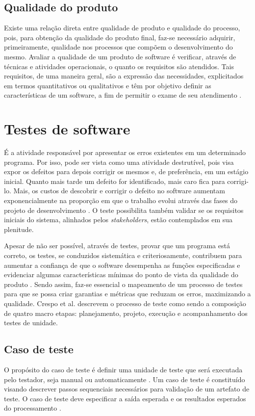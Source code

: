 \documentclass[tg]{mdtufsm}
\begin{document}
\subsection{Qualidade do produto}
Existe uma relação direta entre qualidade de produto e qualidade do processo, pois, para obtenção da qualidade do produto final,
faz-se necessário adquirir, primeiramente, qualidade nos processos que compõem o desenvolvimento do mesmo.
Avaliar a qualidade de um produto de software é verificar, através de técnicas e atividades operacionais, o quanto os requisitos são atendidos. Tais requisitos,
de uma maneira geral, são a expressão das necessidades, explicitados em termos quantitativos ou qualitativos e têm por objetivo definir as características de
um software, a fim de permitir o exame de seu atendimento \cite{koscianski2007qualidade}.

\section{Testes de software}
É a atividade responsável por apresentar os erros existentes em um determinado programa. Por isso, pode ser vista como uma atividade destrutível, pois visa expor os defeitos para depois corrigir os mesmos e, de preferência, em um estágio inicial. Quanto mais tarde um defeito for identificado, mais caro fica para corrigi-lo. Mais, os custos de descobrir e corrigir o defeito no software aumentam exponencialmente na proporção em que o trabalho
evolui através das fases do projeto de desenvolvimento \cite{boehm1976quantitative}. O teste possibilita também validar se os requisitos iniciais do sistema, alinhados pelos \emph{stakeholders}, estão contemplados em sua plenitude.

Apesar de não ser possível, através de testes, provar que um programa está correto, os testes, se conduzidos sistemática e criteriosamente, contribuem para
aumentar a confiança de que o software desempenha as funções especificadas e evidenciar algumas características mínimas do ponto de vista da qualidade do produto \cite{maldonado2004introduccao}. Sendo assim,
faz-se essencial o mapeamento de um processo de testes para que se possa criar garantias e métricas que reduzam os erros, maximizando a qualidade. Crespo et al. \citeyearpar{crespo2004metodologia} descrevem o processo de
teste como sendo a composição de quatro macro etapas: planejamento, projeto, execução e acompanhamento dos testes de unidade.

\subsection{Caso de teste}
O propósito do caso de teste é definir uma unidade de teste que será executada pelo testador, seja manual ou automaticamente \cite{rios2006teste}. Um caso de teste é constituído visando descrever passos sequenciais necessários para validação de um artefato de teste. O caso de teste deve especificar a saída esperada e os resultados esperados do processamento \cite{myers2011art}.
\end{document}
